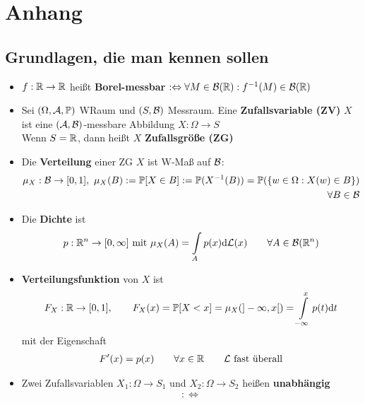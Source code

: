 
\chapter{Anhang}

\setcounter{equation}{1}
\section{Grundlagen, die man kennen sollen}
\begin{itemize}
	\item $f:\mathbb{R}\to\mathbb{R}$ heißt \textbf{Borel-messbar} $:\Leftrightarrow\forall M\in\mathcal{B}(\mathbb{R}):f^{-1}(M)\in\mathcal{B}(\mathbb{R})$
	\item Sei $(\Omega,\mathcal{A}, \mathbb{P})$ WRaum und $(S,\mathcal{B})$ Messraum. Eine \textbf{Zufallsvariable (ZV)} $X$ ist eine $(\mathcal{A},\mathcal{B})$-messbare Abbildung $X:\Omega\to S$\\
	Wenn $S=\mathbb{R}$, dann heißt $X$ \textbf{Zufallsgröße (ZG)}
	\item Die \textbf{Verteilung} einer ZG $X$ ist W-Maß auf $\mathcal{B}$:
	\begin{align*}
		\mu_X:\mathcal{B}\to[0,1],~
		\mu_X(B):=\mathbb{P}[X\in B]:=\mathbb{P}(X^{-1}(B))=\mathbb{P}(\lbrace w\in\Omega:X(w)\in B\rbrace)\\\forall B\in\mathcal{B}
	\end{align*}
	\item Die \textbf{Dichte} ist
	\begin{align*}
		p:\mathbb{R}^n\to[0,\infty]\text{ mit } \mu_X(A)=\int\limits_A p(x)\mathrm{d}\mathcal{L}(x)\qquad\forall A\in\mathcal{B}(\mathbb{R}^n)
	\end{align*}
	\item \textbf{Verteilungsfunktion} von $X$ ist
	\begin{align*}
		F_X:\mathbb{R}\to[0,1],\qquad F_X(x)=\mathbb{P}[X<x]=\mu_X(]-\infty,x[)=\int\limits_{-\infty}^x p(t)\mathrm{d} t
	\end{align*}
	mit der Eigenschaft
	\begin{align*}
		F'(x)=p(x)\qquad\forall x\in\mathbb{R}\qquad\mathcal{L}\text{ fast überall}
	\end{align*}
	\item Zwei Zufallsvariablen $X_1:\Omega\to S_1$ und $X_2:\Omega\to S_2$ heißen \textbf{unabhängig} 
	\begin{align*}
		:\Longleftrightarrow

\end{align*}
\end{itemize}
